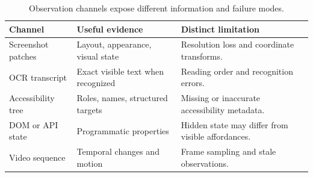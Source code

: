 {\small\setlength{\tabcolsep}{3pt}
\begin{table}[!htbp]
\centering
\caption{Observation channels expose different information and failure modes.}\label{tab:C05:channels}
\begin{tabular}{L{29mm}L{37mm}L{40mm}}

\toprule Channel & Useful evidence & Distinct limitation\\\midrule
Screenshot patches & Layout, appearance, visual state & Resolution loss and coordinate transforms.\\
OCR transcript & Exact visible text when recognized & Reading order and recognition errors.\\
Accessibility tree & Roles, names, structured targets & Missing or inaccurate accessibility metadata.\\
DOM or API state & Programmatic properties & Hidden state may differ from visible affordances.\\
Video sequence & Temporal changes and motion & Frame sampling and stale observations.\\
\bottomrule
\end{tabular}
\end{table}
}


